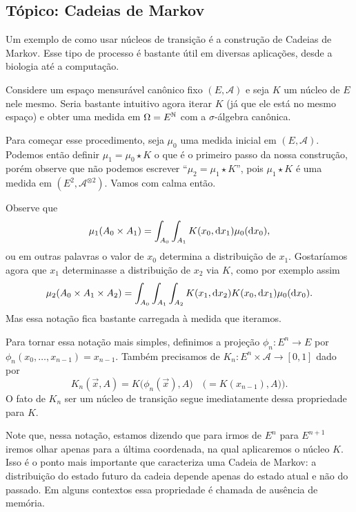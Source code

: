 \begin{topics}
\section{Tópico: Cadeias de Markov}
\label{s:cadeias_Markov}

Um exemplo de como usar núcleos de transição é a construção de Cadeias de Markov.
Esse tipo de processo é bastante útil em diversas aplicações, desde a biologia até a computação.

Considere um espaço mensurável canônico fixo $(E, \mathcal{A})$ e seja $K$ um núcleo de $E$ nele mesmo.
Seria bastante intuitivo agora iterar $K$ (já que ele está no mesmo espaço)
e obter uma medida em $\Omega =E^{{\mathbb N}}$ com a $\sigma$-álgebra canônica.

Para começar esse procedimento, seja $\mu_0$ uma medida inicial em $(E, \mathcal{A})$.
Podemos então definir $\mu_1 = \mu_0 \star K$ o que é
o primeiro passo da nossa construção, porém observe que não podemos escrever
``$\mu_2 = \mu_1 \star K$'', pois $\mu_1 \star K$ é uma medida em $(E^2, \mathcal{A}^{\otimes 2})$.
Vamos com calma então.

Observe que
\begin{equation}
  \mu_1(A_0 \times A_1) = \int_{A_0} \int_{A_1} K(x_0, \mathop{}\!\mathrm{d} x_1) \mu_0(\mathop{}\!\mathrm{d} x_0),
\end{equation}
ou em outras palavras o valor de $x_0$ determina a distribuição de $x_1$.
Gostaríamos agora que $x_1$ determinasse a distribuição de $x_2$ via $K$, como por exemplo assim
\begin{equation}
  \mu_2(A_0 \times A_1 \times A_2) = \int_{A_0} \int_{A_1} \int_{A_2} K(x_1, \mathop{}\!\mathrm{d} x_2) K(x_0, \mathop{}\!\mathrm{d} x_1) \mu_0 (\mathop{}\!\mathrm{d} x_0).
\end{equation}
Mas essa notação fica bastante carregada à medida que iteramos.

Para tornar essa notação mais simples, definimos a projeção $\phi_n:E^n \to E$ por $\phi_n(x_0, \dots, x_{n-1}) = x_{n-1}$.
Também precisamos de $K_n: E^n \times \mathcal{A} \to [0,1]$ dado por
\begin{equation}
  K_n(\vec{x},A) = K\big(\phi_n(\vec{x}), A\big) \quad \big(= K(x_{n-1}),A) \big).
\end{equation}
O fato de $K_n$ ser um núcleo de transição segue imediatamente dessa propriedade para $K$.

Note que, nessa notação, estamos dizendo que para irmos de $E^n$ para $E^{n+1}$ iremos olhar apenas para a última coordenada, na qual aplicaremos o núcleo $K$.
Isso é o ponto mais importante que caracteriza uma Cadeia de Markov: a distribuição do estado futuro da cadeia depende apenas do estado atual e não do passado.
Em alguns contextos essa propriedade é chamada de ausência de memória.


\end{topics}
